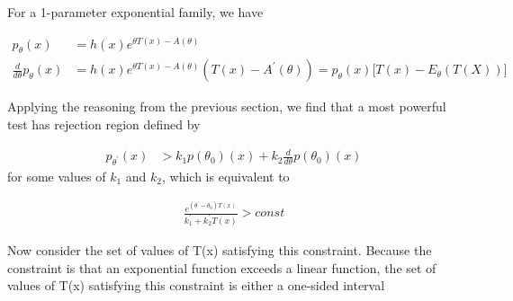 For a 1-parameter exponential family, we have

\begin{align*}
	p_{\theta}(x) &= h(x) e^{\theta T(x) - A(\theta)} \\
	\frac{d}{d\theta} p_{\theta}(x) &= h(x) e^{\theta T(x) - A(\theta)} (T(x) - A^{'}(\theta)) = p_{\theta}(x) \Big[ T(x) - E_{\theta}(T(X)) \Big]
\end{align*}

Applying the reasoning from the previous section, we find that a most powerful test has rejection region defined by

\begin{align*}
	p_{\theta^{'}}(x) & > k_1 p(\theta_0)(x) + k_2 \frac{d}{d\theta} p(\theta_0)(x)
\end{align*}
for some values of $k_1$ and $k_2$, which is equivalent to

\begin{align*}
	\frac{e^{(\theta^{'} - \theta_0) T(x)}}{k_1^{'} + k_2^{'} T(x)} > const
\end{align*}

Now consider the set of values of T(x) satisfying this constraint. Because the constraint is that an exponential function exceeds a linear function, the set of values of T(x) satisfying
this constraint is either a one-sided interval



